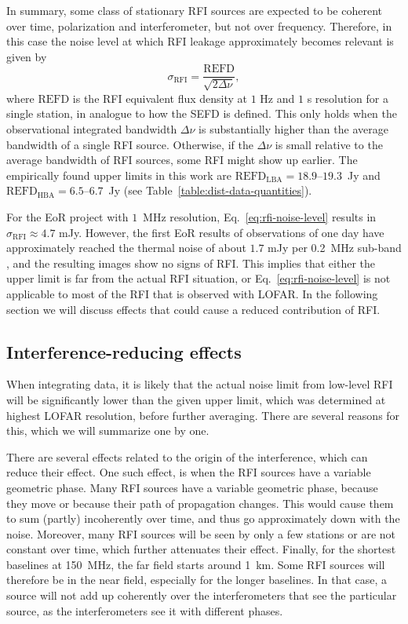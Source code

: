 \documentclass[useAMS,usenatbib]{mn2e}
\begin{document}
In summary, some class of stationary RFI sources are expected to be coherent over time, polarization and interferometer, but not over frequency. Therefore, in this case the noise level at which RFI leakage approximately becomes relevant is given by
\begin{equation} \label{eq:rfi-noise-level}
 \sigma_\textrm{RFI} = \frac{\textrm{REFD}}{\sqrt{2 \Delta \nu}},
\end{equation}
where $\textrm{REFD}$ is the RFI equivalent flux density at $1$ Hz and $1$ s resolution for a single station, in analogue to how the SEFD is defined. This only holds when the observational integrated bandwidth $\Delta \nu$ is substantially higher than the average bandwidth of a single RFI source. Otherwise, if the $\Delta \nu$ is small relative to the average bandwidth of RFI sources, some RFI might show up earlier. The empirically found upper limits in this work are $\textrm{REFD}_\textrm{LBA}=18.9$--$19.3$~Jy and $\textrm{REFD}_\textrm{HBA}=6.5$--$6.7$~Jy (see Table~\ref{table:dist-data-quantities}).

For the EoR project with $1$~MHz resolution, Eq.~\ref{eq:rfi-noise-level} results in $\sigma_\textrm{RFI}\approx 4.7$ mJy. However, the first EoR results of observations of one day have approximately reached the thermal noise of about $1.7$ mJy per 0.2~MHz sub-band \citep{ncp-eor-yatawatta}, and the resulting images show no signs of RFI. This implies that either the upper limit is far from the actual RFI situation, or Eq.~\ref{eq:rfi-noise-level} is not applicable to most of the RFI that is observed with LOFAR. In the following section we will discuss effects that could cause a reduced contribution of RFI.

\subsection{Interference-reducing effects} \label{sec:coherence-reduction}
When integrating data, it is likely that the actual noise limit from low-level RFI will be significantly lower than the given upper limit, which was determined at highest LOFAR resolution, before further averaging. There are several reasons for this, which we will summarize one by one.

There are several effects related to the origin of the interference, which can reduce their effect. One such effect, is when the RFI sources have a variable geometric phase. Many RFI sources have a variable geometric phase, because they move or because their path of propagation changes. This would cause them to sum (partly) incoherently over time, and thus go approximately down with the noise. Moreover, many RFI sources will be seen by only a few stations or are not constant over time, which further attenuates their effect. Finally, for the shortest baselines at 150~MHz, the far field starts around 1~km. Some RFI sources will therefore be in the near field, especially for the longer baselines. In that case, a source will not add up coherently over the interferometers that see the particular source, as the interferometers see it with different phases.
\end{document}
